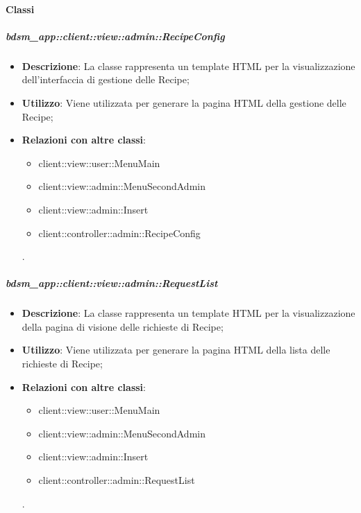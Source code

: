 	\paragraph{Classi} %
		\subparagraph{bdsm\_app::client::view::admin::RecipeConfig} %
		\label{subp:bdsm_app_client_view_admin_recipeconfig}
			\begin{itemize}
				\item \textbf{Descrizione}: La classe rappresenta un template HTML per la visualizzazione dell'interfaccia di gestione delle Recipe;
				\item \textbf{Utilizzo}: Viene utilizzata per generare la pagina HTML della gestione delle Recipe;
				\item \textbf{Relazioni con altre classi}: 		
					\begin{itemize}
						\item client::view::user::MenuMain
						\item client::view::admin::MenuSecondAdmin
						\item client::view::admin::Insert
						\item client::controller::admin::RecipeConfig
					\end{itemize}.
			\end{itemize}

		\subparagraph{bdsm\_app::client::view::admin::RequestList} %
		\label{subp:bdsm_app_client_view_admin_requestlist}
			\begin{itemize}
				\item \textbf{Descrizione}: La classe rappresenta un template HTML per la visualizzazione della pagina di visione delle richieste di Recipe;
				\item \textbf{Utilizzo}: Viene utilizzata per generare la pagina HTML della lista delle richieste di Recipe;
				\item \textbf{Relazioni con altre classi}: 		
					\begin{itemize}
						\item client::view::user::MenuMain
						\item client::view::admin::MenuSecondAdmin
						\item client::view::admin::Insert
						\item client::controller::admin::RequestList
					\end{itemize}.
			\end{itemize}

